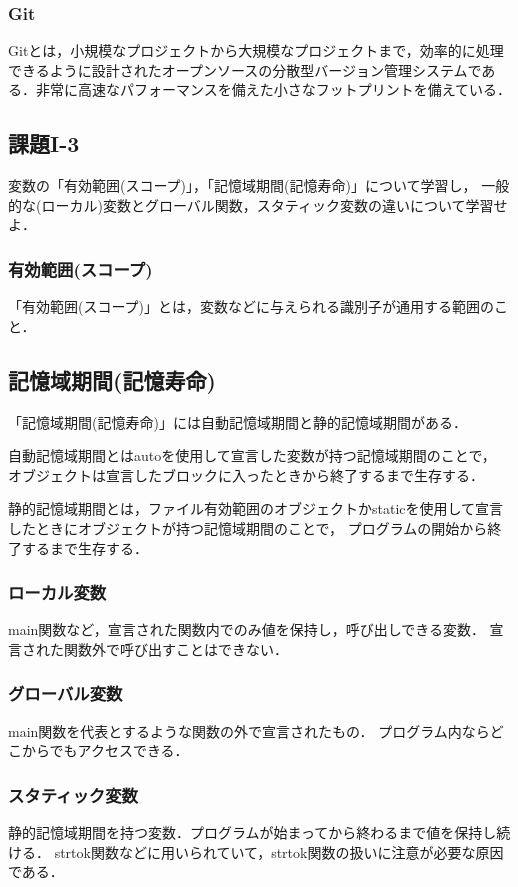 \documentclass[]{jarticle}
\begin{document}
\subsubsection{Git}
Gitとは，小規模なプロジェクトから大規模なプロジェクトまで，効率的に処理できるように設計されたオープンソースの分散型バージョン管理システムである．非常に高速なパフォーマンスを備えた小さなフットプリントを備えている．
%
% 
\subsection{課題I-3}
変数の「有効範囲(スコープ)」，「記憶域期間(記憶寿命)」について学習し，
一般的な(ローカル)変数とグローバル関数，スタティック変数の違いについて学習せよ．
% 
\subsubsection{有効範囲(スコープ)}
「有効範囲(スコープ)」とは，変数などに与えられる識別子が通用する範囲のこと．

\subsection{記憶域期間(記憶寿命)}
「記憶域期間(記憶寿命)」には自動記憶域期間と静的記憶域期間がある．

自動記憶域期間とはautoを使用して宣言した変数が持つ記憶域期間のことで，
オブジェクトは宣言したブロックに入ったときから終了するまで生存する．

静的記憶域期間とは，ファイル有効範囲のオブジェクトかstaticを使用して宣言したときにオブジェクトが持つ記憶域期間のことで，
プログラムの開始から終了するまで生存する．

\subsubsection{ローカル変数}
main関数など，宣言された関数内でのみ値を保持し，呼び出しできる変数．
宣言された関数外で呼び出すことはできない．
% 
\subsubsection{グローバル変数}
main関数を代表とするような関数の外で宣言されたもの．
プログラム内ならどこからでもアクセスできる．
% 
\subsubsection{スタティック変数}
静的記憶域期間を持つ変数．プログラムが始まってから終わるまで値を保持し続ける．
strtok関数などに用いられていて，strtok関数の扱いに注意が必要な原因である．
% 
%
\end{document}
